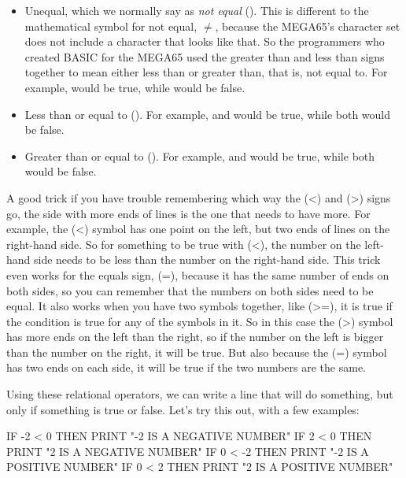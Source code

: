 \begin{itemize}
\item Unequal, which we normally say as {\em not equal}
  (\stw{<>}). This is different to the mathematical symbol for not
  equal, $\ne$, because the MEGA65's character set does not include a
  character that looks like that. So the programmers who created BASIC
  for the MEGA65 used the greater than and less than signs together
  to mean either less than or greater than, that is, not equal to.
  For example,  would be true,
    while  would be false.
  \item Less than or equal to (\stw{<=}). For example,  and
     would be true,
    while both  would be false.
  \item Greater than or equal to (\stw{>=}). For example, 
    and  would be
    true, while both  would be false.
\end{itemize}

A good trick if you have trouble remembering which way the \stw(<) and \stw(>)
signs go, the side with more ends of lines is the one that needs to
have more. For example, the \stw(<) symbol has one point on the left, but
two ends of lines on the right-hand side.  So for something to be true
with \stw(<), the number on the left-hand side needs to be less than the number
on the right-hand side.  This trick even works for the equals sign, \stw(=),
because it has the same number of ends on both sides, so you can
remember that the numbers on both sides need to be equal.  It also
works when you have two symbols together, like \stw(>=), it is true if
the condition is true for any of the symbols in it. So in this case
the \stw(>) symbol has more ends on the left than the right, so if the
number on the left is bigger than the number on the right, it will be
true. But also because the \stw(=) symbol has two ends on each side,
it will be true if the two numbers are the same.

\needspace{2cm}
Using these relational operators, we can write a line that will do
something, but only if something is true or false.  Let's try this
out, with a few examples:

\begin{screencode}
  IF -2 < 0 THEN PRINT "-2 IS A NEGATIVE NUMBER"
  IF 2 < 0 THEN PRINT "2 IS A NEGATIVE NUMBER"
  IF 0 < -2 THEN PRINT "-2 IS A POSITIVE NUMBER"
  IF 0 < 2 THEN PRINT "2 IS A POSITIVE NUMBER"
\end{screencode}

